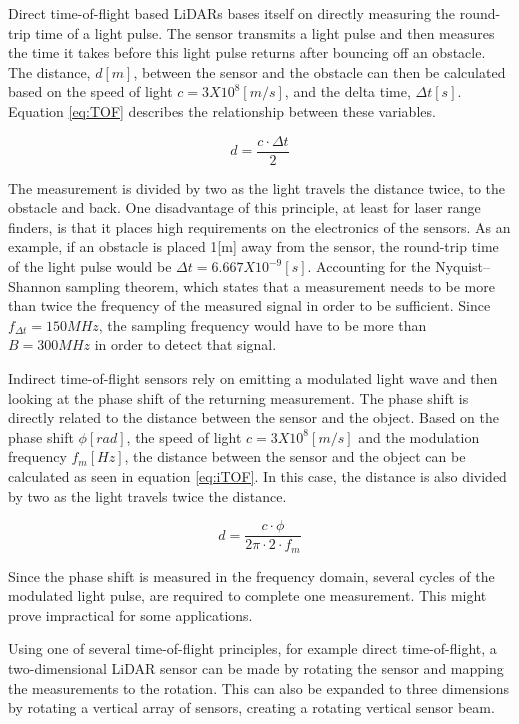 Direct time-of-flight based LiDARs bases itself on directly measuring the round-trip time of a light pulse. The sensor transmits a light pulse and then measures the time it takes before this light pulse returns after bouncing off an obstacle. The distance, $d[m]$, between the sensor and the obstacle can then be calculated based on the speed of light $c=3X10^8[m/s]$, and the delta time, $\Delta t[s]$. Equation \ref{eq:TOF} describes the relationship between these variables.

\begin{equation}\label{eq:TOF}
d = \frac{c \cdot \Delta t}{2}
\end{equation}

The measurement is divided by two as the light travels the distance twice, to the obstacle and back. One disadvantage of this principle, at least for laser range finders, is that it places high requirements on the electronics of the sensors. As an example, if an obstacle is placed 1[m] away from the sensor, the round-trip time of the light pulse would be $\Delta t=6.667X10^{-9}[s]$. Accounting for the Nyquist–Shannon sampling theorem, which states that a measurement needs to be more than twice the frequency of the measured signal in order to be sufficient. Since $f_{\Delta t}=150MHz$, the sampling frequency would have to be more than $B=300MHz$ in order to detect that signal. 

Indirect time-of-flight sensors rely on emitting a modulated light wave and then looking at the phase shift of the returning measurement. The phase shift is directly related to the distance between the sensor and the object. Based on the phase shift $\phi[rad]$, the speed of light $c=3X10^8[m/s]$ and the modulation frequency $f_m[Hz]$, the distance between the sensor and the object can be calculated as seen in equation \ref{eq:iTOF}. In this case, the distance is also divided by two as the light travels twice the distance.

\begin{equation}\label{eq:iTOF}
d = \frac{c \cdot \phi}{2\pi \cdot 2 \cdot f_m}
\end{equation}

Since the phase shift is measured in the frequency domain, several cycles of the modulated light pulse, are required to complete one measurement. This might prove impractical for some applications.

Using one of several time-of-flight principles, for example direct time-of-flight, a two-dimensional LiDAR sensor can be made by rotating the sensor and mapping the measurements to the rotation. This can also be expanded to three dimensions by rotating a vertical array of sensors, creating a rotating vertical sensor beam.

